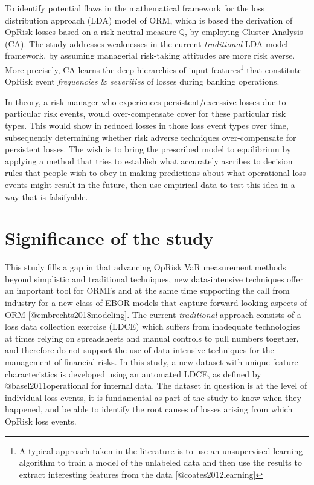 \documentclass[]{article}
\let\rmarkdownfootnote\footnote%
\def\footnote{\protect\rmarkdownfootnote}
\begin{document}
To identify potential flaws in the mathematical framework for the loss
distribution approach (LDA) model of ORM, which is based the derivation
of OpRisk losses based on a risk-neutral measure \(\mathbb{Q}\), by
employing Cluster Analysis (CA). The study addresses weaknesses in the
current \emph{traditional} LDA model framework, by assuming managerial
risk-taking attitudes are more risk averse. More precisely, CA learns
the deep hierarchies of input
features\footnote{A typical approach taken in the literature is to use an unsupervised learning algorithm to train a model of the unlabeled data and then use the results to extract interesting features from the data [@coates2012learning]}
that constitute OpRisk event \emph{frequencies} \& \emph{severities} of
losses during banking operations.\medskip

In theory, a risk manager who experiences persistent/excessive losses
due to particular risk events, would over-compensate cover for these
particular risk types. This would show in reduced losses in those loss
event types over time, subsequently determining whether risk adverse
techniques over-compensate for persistent losses. The wish is to bring
the prescribed model to equilibrium by applying a method that tries to
establish what accurately ascribes to decision rules that people wish to
obey in making predictions about what operational loss events might
result in the future, then use empirical data to test this idea in a way
that is falsifyable.

\section{Significance of the study}
\label{sec:Significance of the study}

This study fills a gap in that advancing OpRisk VaR measurement methods
beyond simplistic and traditional techniques, new data-intensive
techniques offer an important tool for ORMFs and at the same time
supporting the call from industry for a new class of EBOR models that
capture forward-looking aspects of ORM {[}@embrechts2018modeling{]}. The
current \emph{traditional} approach consists of a loss data collection
exercise (LDCE) which suffers from inadequate technologies at times
relying on spreadsheets and manual controls to pull numbers together,
and therefore do not support the use of data intensive techniques for
the management of financial risks. In this study, a new dataset with
unique feature characteristics is developed using an automated LDCE, as
defined by @basel2011operational for internal data. The dataset in
question is at the level of individual loss events, it is fundamental as
part of the study to know when they happened, and be able to identify
the root causes of losses arising from which OpRisk loss
events.\medskip 
\end{document}
